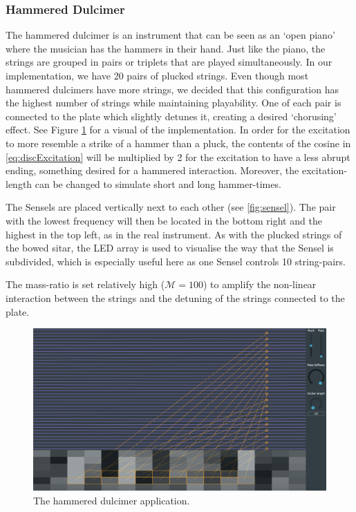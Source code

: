 \documentclass{article}
\begin{document}
\subsubsection{Hammered Dulcimer}
The hammered dulcimer is an instrument that can be seen as an `open piano' where the musician has the hammers in their hand. Just like the piano, the strings are grouped in pairs or triplets
that are played simultaneously. 
In our implementation, we have 20 pairs of plucked strings. Even though most hammered dulcimers have more strings, we decided that this configuration has the highest number of strings while maintaining playability. One of each pair is connected to the plate which slightly detunes it, creating a desired `chorusing' effect. See Figure \ref{fig:dulcimer} for a visual of the implementation. In order for the excitation to more resemble a strike of a hammer than a pluck, the contents of the cosine in \eqref{eq:discExcitation} will be multiplied by 2 for the excitation to have a less abrupt ending, something desired for a hammered interaction. Moreover, the excitation-length can be changed to simulate short and long hammer-times.

The Sensels are placed vertically next to each other (see \ref{fig:sensel}). The pair with the lowest frequency will then be located in the bottom right and the highest in the top left, as in the real instrument. As with the plucked strings of the bowed sitar, the LED array is used to visualise the way that the Sensel is subdivided, which is especially useful here as one Sensel controls 10 string-pairs. 

The mass-ratio is set relatively high ($\mathcal{M} = 100$) to amplify the non-linear interaction between the strings and the detuning of the strings connected to the plate. 

\begin{figure}[h]
\centering
\includegraphics[width=1.0\columnwidth]{dulcimer.png}
\caption{The hammered dulcimer application. \label{fig:dulcimer}}
\end{figure}
\end{document}
